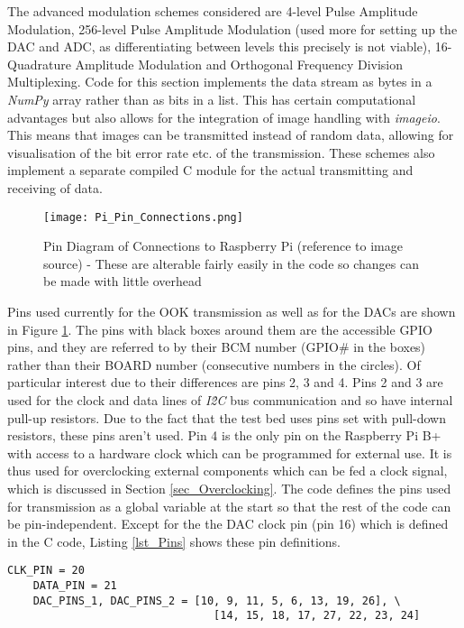 \documentclass[../main.tex]{subfiles}
\begin{document}
The advanced modulation schemes considered are 4-level Pulse Amplitude Modulation, 256-level Pulse Amplitude Modulation (used more for setting up the DAC and ADC, as differentiating between levels this precisely is not viable), 16-Quadrature Amplitude Modulation and Orthogonal Frequency Division Multiplexing.
Code for this section implements the data stream as bytes in a \textit{NumPy} array rather than as bits in a list.
This has certain computational advantages but also allows for the integration of image handling with \textit{imageio}.
This means that images can be transmitted instead of random data, allowing for visualisation of the bit error rate etc. of the transmission.
These schemes also implement a separate compiled C module for the actual transmitting and receiving of data.\\

\begin{figure}[ht]
	\centering
	\texttt{[image: Pi\_Pin\_Connections.png]}
	\caption{Pin Diagram of Connections to Raspberry Pi (reference to image source) - These are alterable fairly easily in the code so changes can be made with little overhead}
	\label{fig_Pin Connections}
\end{figure}

Pins used currently for the OOK transmission as well as for the DACs are shown in Figure \ref{fig_Pin Connections}.
The pins with black boxes around them are the accessible GPIO pins, and they are referred to by their BCM number (GPIO# in the boxes) rather than their BOARD number (consecutive numbers in the circles).
Of particular interest due to their differences are pins 2, 3 and 4.
Pins 2 and 3 are used for the clock and data lines of \textit{I\^2C} bus communication and so have internal pull-up resistors.
Due to the fact that the test bed uses pins set with pull-down resistors, these pins aren't used.
Pin 4 is the only pin on the Raspberry Pi B+ with access to a hardware clock which can be programmed for external use.
It is thus used for overclocking external components which can be fed a clock signal, which is discussed in Section \ref{sec_Overclocking}.
The code defines the pins used for transmission as a global variable at the start so that the rest of the code can be pin-independent.
Except for the the DAC clock pin (pin 16) which is defined in the C code, Listing \ref{lst_Pins} shows these pin definitions.\\

\begin{lstlisting}[caption=Pins used for OOK and the DACs]
	CLK_PIN = 20
	DATA_PIN = 21
	DAC_PINS_1, DAC_PINS_2 = [10, 9, 11, 5, 6, 13, 19, 26], \
								[14, 15, 18, 17, 27, 22, 23, 24]
\end{lstlisting} \label{lst_Pins}
\end{document}
